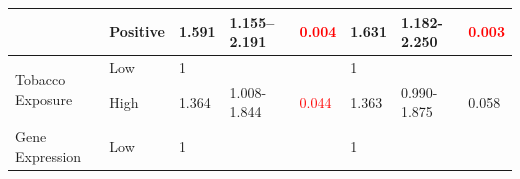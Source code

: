 \documentclass[jpm,article,submit,moreauthors,pdftex]{Definitions/mdpi}
\begin{document}
\begin{table}[hbt!]
{\begin{tabular}{|l|l|l|l|l|l|l|l|}
\cline{2-8}
                                        & Positive                                                                            & 1.591                                                                          & 1.155–2.191                                                                   & \textcolor{red}{0.004}                                                        & 1.631                                                                          & 1.182-2.250                                                                   & \textcolor{red}{0.003}                                                         \\ 
\hline
\multirow{2}{*}{Tobacco Exposure}       & {\cellcolor[rgb]{0.62,0.812,0.878}}Low                                              & {\cellcolor[rgb]{0.62,0.812,0.878}}1                                           & {\cellcolor[rgb]{0.62,0.812,0.878}}                                           & {\cellcolor[rgb]{0.62,0.812,0.878}}                                           & {\cellcolor[rgb]{0.62,0.812,0.878}}1                                           & {\cellcolor[rgb]{0.62,0.812,0.878}}                                           & {\cellcolor[rgb]{0.62,0.812,0.878}}                                            \\ 
\cline{2-8}
                                        & High                                                                                & 1.364                                                                          & 1.008-1.844                                                                   & \textcolor{red}{0.044}                                                        & 1.363                                                                          & 0.990-1.875                                                                   & 0.058                                                                          \\ 
\hline
\multirow{2}{*}{Gene Expression}                & {\cellcolor[rgb]{0.62,0.812,0.878}}Low                                              & {\cellcolor[rgb]{0.62,0.812,0.878}}1                                           & {\cellcolor[rgb]{0.62,0.812,0.878}}                                           & {\cellcolor[rgb]{0.62,0.812,0.878}}                                           & {\cellcolor[rgb]{0.62,0.812,0.878}}1                                           & {\cellcolor[rgb]{0.62,0.812,0.878}}                                           & {\cellcolor[rgb]{0.62,0.812,0.878}}                                            \\ 

\end{tabular}}
\end{table}
\end{document}
